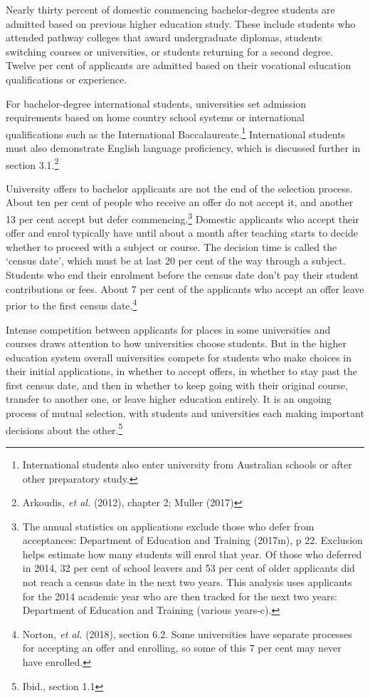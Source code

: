 \documentclass[]{book}
\begin{document}
Nearly thirty percent of domestic commencing bachelor-degree students are admitted based on previous higher education study. These include students who attended pathway colleges that award undergraduate diplomas, students switching courses or universities, or students returning for a second degree. Twelve per cent of applicants are admitted based on their vocational education qualifications or experience.

For bachelor-degree international students, universities set admission requirements based on home country school systems or international qualifications such as the International Baccalaureate.\footnote{International students also enter university from Australian schools or after other preparatory study.} International students must also demonstrate English language proficiency, which is discussed further in section 3.1.\footnote{Arkoudis\emph{, et al.} (2012), chapter 2; Muller (2017)}

University offers to bachelor applicants are not the end of the selection process. About ten per cent of people who receive an offer do not accept it, and another 13 per cent accept but defer commencing.\footnote{The annual statistics on applications exclude those who defer from acceptances: Department of Education and Training (2017m), p 22. Exclusion helps estimate how many students will enrol that year. Of those who deferred in 2014, 32 per cent of school leavers and 53 per cent of older applicants did not reach a census date in the next two years. This analysis uses applicants for the 2014 academic year who are then tracked for the next two years: Department of Education and Training (various years-c).} Domestic applicants who accept their offer and enrol typically have until about a month after teaching starts to decide whether to proceed with a subject or course. The decision time is called the `census date', which must be at last 20 per cent of the way through a subject. Students who end their enrolment before the census date don't pay their student contributions or fees. About 7 per cent of the applicants who accept an offer leave prior to the first census date.\footnote{Norton\emph{, et al.} (2018), section 6.2. Some universities have separate processes for accepting an offer and enrolling, so some of this 7 per cent may never have enrolled.}

Intense competition between applicants for places in some universities and courses draws attention to how universities choose students. But in the higher education system overall universities compete for students who make choices in their initial applications, in whether to accept offers, in whether to stay past the first census date, and then in whether to keep going with their original course, transfer to another one, or leave higher education entirely. It is an ongoing process of mutual selection, with students and universities each making important decisions about the other.\footnote{Ibid., section 1.1}
\end{document}
